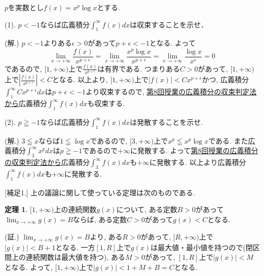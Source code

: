 \documentclass[dvipdfmx,a4paper,11pt]{article}
\theoremstyle{definition}
\newtheorem{thm}{定理}
\begin{document}
{\large$p$を実数とし$f(x) = x^p \log x$とする. }
\vspace{11pt}

{\large(1). $p< -1$ならば広義積分$\int_{1}^{\infty} f(x) dx$は収束することを示せ．}

\hspace{-11pt}(解.)
$p<-1$よりある$\epsilon >0$があって$p+\epsilon<-1$となる.
よって
$$
\lim_{x \rightarrow +\infty}\frac{f(x)}{x^{p+\epsilon}}=
\lim_{x \rightarrow +\infty}\frac{x^p \log x}{x^{p+\epsilon}}
=\lim_{x \rightarrow +\infty}\frac{\log x}{x^{\epsilon}}
=0
$$
であるので, $[1, + \infty)$上で$\frac{f(x)}{x^{p+\epsilon}}$は有界である.
つまりある$C>0$があって, $[1, + \infty)$上で$|\frac{f(x)}{x^{p+\epsilon}}| < C$となる.
以上より, $[1, + \infty)$上で$|f(x)| < C{x^{p+\epsilon}}$かつ, 広義積分$\int_{1}^{\infty}C{x^{p+\epsilon}}dx$は$p+\epsilon<-1$より収束するので, \underline{第8回授業の広義積分の収束判定法から}広義積分$\int_{1}^{\infty} f(x) dx$も収束する.

\vspace{11pt}

{\large(2). $p\geqq -1$ならば広義積分$\int_{1}^{\infty} f(x) dx$は発散することを示せ.}

\hspace{-11pt}(解.)
$3 \leqq x$ならば$1 \leqq \log x$であるので, $[3, + \infty)$上で$x^p\leqq x^p\log x$である. また広義積分$\int_{3}^{\infty} x^p dx$は$p\geqq -1$であるので$+ \infty$に発散する. よって\underline{第8回授業の広義積分の収束判定法から}広義積分$\int_{3}^{\infty} f(x) dx$も$+ \infty$に発散する. 以上より広義積分$\int_{1}^{\infty} f(x) dx$も$+ \infty$に発散する.

\vspace{11pt}
[補足1.] 上の議論に関して使っている定理は次のものである.
 \begin{thm}
$[1, +\infty)$上の連続関数$g(x)$について, ある定数$B>0$があって$\lim_{x \rightarrow +\infty}g(x)=B$ならば, ある定数$C>0$があって$g(x) < C$となる. 
 \end{thm}

(証.) $\lim_{x \rightarrow +\infty}g(x)=B$より, ある$R>0$があって, $[R, + \infty)$上で$|g(x)| < B+1$となる. 一方$[1,R]$上で$g(x)$は最大値・最小値を持つので(閉区間上の連続関数は最大値を持つ), ある$M>0$があって,  $[1, R]$上で$|g(x)| <M$となる. よって, $[1, + \infty)$上で$|g(x) |< 1+M+B =C$となる. 
  
\end{document}
